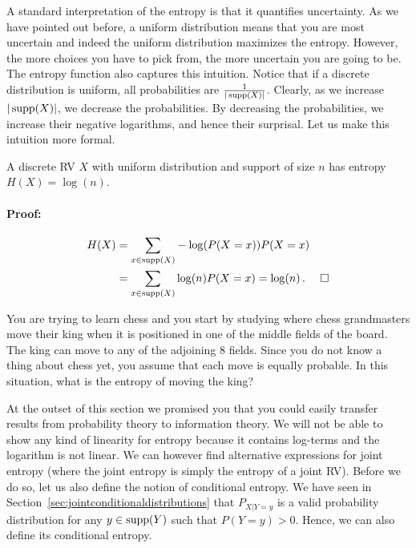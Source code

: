 A standard interpretation of the entropy is that it quantifies uncertainty. As we have pointed out
before, a uniform distribution means that you are most uncertain and
indeed the uniform distribution maximizes the entropy. However, the more choices you have to pick from, the more uncertain you are going to be. 
The entropy function also captures this intuition. Notice that if a discrete distribution is uniform,
all probabilities are $ \frac{1}{|\operatorname{supp}(X)|} $. Clearly, as we increase $ |\operatorname{supp}(X)| $, we decrease the
probabilities. By decreasing the probabilities, we increase their negative logarithms, and hence their
surprisal. Let us make this intuition more formal.

\begin{Theorem}
A discrete RV $ X $ with uniform distribution and support of size $ n $ has entropy
$ H(X) = \log(n) $.
\end{Theorem}

\paragraph{Proof:}
\begin{align}
H(X) &= \underset{x \in \operatorname{supp}(X)}{\sum}-\log(P(X=x))P(X=x) \\
&= \underset{x \in \operatorname{supp}(X)}{\sum}\log(n)P(X=x) = \log(n) \, . ~~~~\square
\end{align}

\begin{Exercise}
You are trying to learn chess and you start by studying where chess grandmasters move their king when it
is positioned in one of the middle fields of the board. The king can move to any of the adjoining 8 fields. Since
you do not know a thing about chess yet, you assume that each move is equally probable. In this situation,
what is the entropy of moving the king?
\end{Exercise}

At the outset of this section we promised you that you could easily transfer results from probability 
theory to information theory. We will not be able to show any kind of linearity for entropy because it contains
log-terms and the logarithm is not linear. We can however find alternative expressions for joint entropy (where 
the joint entropy is simply the entropy of a joint RV). Before we do so, let us also define the notion of 
conditional entropy. We have seen in Section~\ref{sec:jointconditionaldistributions} that $P_{X|Y=y}$ is a valid probability distribution for any $y \in \operatorname{supp}(Y)$ such that $P(Y=y)>0$. Hence, we can also define its conditional entropy.


